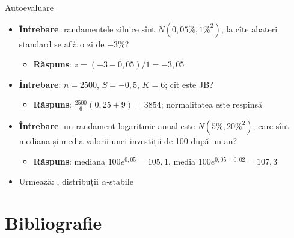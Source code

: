 \begin{frame}{Autoevaluare}
\itemsize{\small}
\begin{itemize}
    \item \textbf{Întrebare}: randamentele zilnice sînt $N(0{,}05\%, 1\%^2)$; la cîte abateri standard se află o zi de $-3\%$?
    \begin{itemize}
        \item \textbf{Răspuns}: $z = (-3 - 0{,}05)/1 = -3{,}05$
    \end{itemize}
    \item \textbf{Întrebare}: $n = 2500$, $S = -0{,}5$, $K = 6$; cît este JB?
    \begin{itemize}
        \item \textbf{Răspuns}: $\frac{2500}{6}(0{,}25 + 9) = 3854$; normalitatea este respinsă
    \end{itemize}
    \item \textbf{Întrebare}: un randament logaritmic anual este $N(5\%, 20\%^2)$; care sînt mediana și media valorii unei investiții de 100 după un an?
    \begin{itemize}
        \item \textbf{Răspuns}: mediana $100e^{0{,}05} = 105{,}1$, media $100e^{0{,}05 + 0{,}02} = 107{,}3$
    \end{itemize}
    \item Urmează: , distribuții $\alpha$-stabile
\end{itemize}
\end{frame}


\section{Bibliografie}

